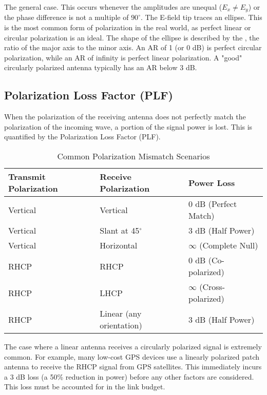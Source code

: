  The general case. This occurs whenever the amplitudes are unequal ($E_x \neq E_y$) or the phase difference is not a multiple of $90^\circ$.
 The E-field tip traces an ellipse. This is the most common form of polarization in the real world, as perfect linear or circular polarization is an ideal.
 The shape of the ellipse is described by the , the ratio of the major axis to the minor axis. An AR of 1 (or 0 dB) is perfect circular polarization, while an AR of infinity is perfect linear polarization. A "good" circularly polarized antenna typically has an AR below 3 dB.


\subsection{Polarization Loss Factor (PLF)}

When the polarization of the receiving antenna does not perfectly match the polarization of the incoming wave, a portion of the signal power is lost. This is quantified by the Polarization Loss Factor (PLF).

\begin{table}[H]
    \centering
    \caption{Common Polarization Mismatch Scenarios}
    \label{tab:plf-summary}
    \begin{tabular}{@{}lll@{}}
        \toprule
        \tableheaderfont Transmit Polarization & \tableheaderfont Receive Polarization & \tableheaderfont Power Loss \\
        \midrule
        Vertical & Vertical & 0 dB (Perfect Match) \\
        Vertical & Slant at 45$^\circ$ & 3 dB (Half Power) \\
        Vertical & Horizontal & $\infty$ (Complete Null) \\
        \addlinespace
        RHCP & RHCP & 0 dB (Co-polarized) \\
        RHCP & LHCP & $\infty$ (Cross-polarized) \\
        \addlinespace
        RHCP & Linear (any orientation) & 3 dB (Half Power) \\
        \bottomrule
    \end{tabular}
\end{table}

\begin{importantbox}[title={The Critical 3 dB Loss}]
    The case where a linear antenna receives a circularly polarized signal is extremely common. For example, many low-cost GPS devices use a linearly polarized patch antenna to receive the RHCP signal from GPS satellites. This immediately incurs a 3 dB loss (a 50\% reduction in power) before any other factors are considered. This loss must be accounted for in the link budget.
\end{importantbox}


